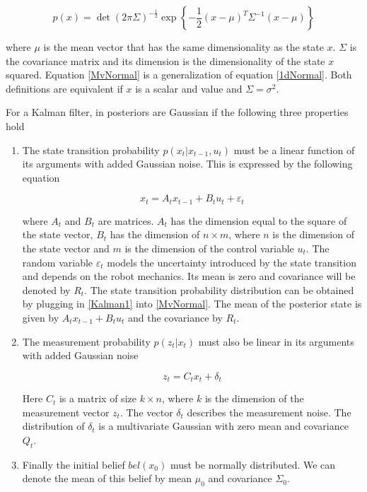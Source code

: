 \documentclass[conference]{IEEEtran}
\begin{document}
 \begin{equation}\label{MvNormal}
p(x) = \det(2 \pi \Sigma) ^ {-\frac{1}{2}} \exp\left\{ - \frac{1}{2} (x - \mu)^T \Sigma ^ {-1} (x - \mu) \right\}
\end{equation}

where $\mu$ is the mean vector that has the same dimensionality as the state $x$. $\Sigma$ is the covariance matrix and its dimension is the dimensionality of the state $x$ squared. Equation \ref{MvNormal} is a generalization of equation \ref{1dNormal}. Both definitions are equivalent if $x$ is a scalar and value and $\Sigma = \sigma ^ 2$.

For a Kalman filter, in posteriors are Gaussian if the following three properties hold\\

\begin{enumerate}
\item The state transition probability $p(x_t|x_{t-1}, u_t)$ must be a linear function of its arguments with added Gaussian noise. This is expressed by the following equation

 \begin{equation}\label{Kalman1}
x_t = A_tx_{t-1} + B_tu_t + \varepsilon_t
\end{equation}

where $A_t$ and $B_t$ are matrices. $A_t$ has the dimension equal to the square of the state vector, $B_t$ has the dimension of $n \times m$, where $n$ is the dimension of the state vector and $m$ is the dimension of the control variable $u_t$. The random variable $\varepsilon_t$ models the uncertainty introduced by the state transition and depends on the robot mechanics. Its mean is zero and covariance will be denoted by $R_t$. The state transition probability distribution can be obtained by plugging in \ref{Kalman1} into \ref{MvNormal}. The mean of the posterior state is given by $A_tx_{t-1} + B_tu_t$ and the covariance by $R_t$.\\

\item The measurement probability $p(z_t|x_t)$ must also be linear in its arguments with added Gaussian noise

 \begin{equation}\label{Kalman2}
z_t = C_tx_{t} + \delta_t
\end{equation}

Here $C_t$ is a matrix of size $k \times n$, where $k$ is the dimension of the measurement vector $z_t$. The vector $\delta_t$ describes the measurement noise. The distribution of $\delta_t$ is a multivariate Gaussian with zero mean and covariance $Q_t$.\\

\item Finally the initial belief $bel(x_0)$ must be normally distributed. We can denote the mean of this belief by mean $\mu_0$ and covariance $\Sigma_0$.
\end{enumerate}
\end{document}
